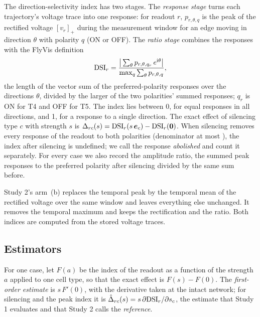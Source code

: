 The direction-selectivity index has two stages. The \emph{response stage} turns each trajectory's voltage trace into one response: for readout $r$, $p_{r,\theta,q}$ is the peak of the rectified voltage $[v_r]_+$ during the measurement window for an edge moving in direction $\theta$ with polarity $q$ (ON or OFF). The \emph{ratio stage} combines the responses with the FlyVis definition
\begin{equation}
  \mathrm{DSI}_r = \frac{\big|\sum_\theta p_{r,\theta,q_r}\,e^{\mathrm{i}\theta}\big|}{\max_q \sum_\theta p_{r,\theta,q}},
  \label{eq:dsi}
\end{equation}
the length of the vector sum of the preferred-polarity responses over the directions $\theta$, divided by the larger of the two polarities' summed responses; $q_r$ is ON for T4 and OFF for T5. The index lies between 0, for equal responses in all directions, and 1, for a response to a single direction. The exact effect of silencing type $c$ with strength $s$ is $\Delta_{rc}(s)=\mathrm{DSI}_r(s\,\bm e_c)-\mathrm{DSI}_r(\bm 0)$. When silencing removes every response of the readout to both polarities (denominator at most \DenomThreshold{}), the index after silencing is undefined; we call the response \emph{abolished} and count it separately. For every case we also record the amplitude ratio, the summed peak responses to the preferred polarity after silencing divided by the same sum before.

Study 2's arm~(b) replaces the temporal peak by the temporal mean of the rectified voltage over the same window and leaves everything else unchanged. It removes the temporal maximum and keeps the rectification and the ratio. Both indices are computed from the stored voltage traces.

\subsection{Estimators}
\label{sec:estimators}

For one case, let $F(a)$ be the index of the readout as a function of the strength $a$ applied to one cell type, so that the exact effect is $F(s)-F(0)$. The \emph{first-order estimate} is $s\,F'(0)$, with the derivative taken at the intact network; for silencing and the peak index it is $\hat\Delta_{rc}(s)=s\,\partial\mathrm{DSI}_r/\partial s_c$, the estimate that Study 1 evaluates and that Study 2 calls the \emph{reference}.

